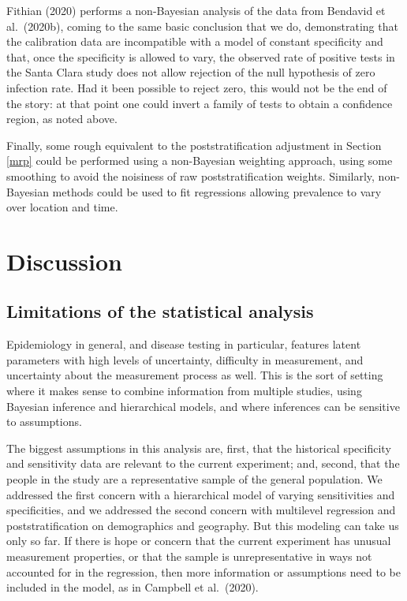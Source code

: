 \documentclass[11pt]{article}
\begin{document}
Fithian (2020) performs a non-Bayesian analysis of the data from Bendavid et al.\ (2020b), coming to the same basic conclusion that we do, demonstrating that the calibration data are incompatible with a model of constant specificity and that, once the specificity is allowed to vary, the observed rate of positive tests in the Santa Clara study does not allow rejection of the null hypothesis of zero infection rate.  Had it been possible to reject zero, this would not be the end of the story:  at that point one could invert a family of tests to obtain a confidence region, as noted above.

Finally, some rough equivalent to the poststratification adjustment in Section \ref{mrp} could be performed using a non-Bayesian weighting approach, using some smoothing to avoid the noisiness of raw poststratification weights.  Similarly, non-Bayesian methods could be used to fit regressions allowing prevalence to vary over location and time.

\section{Discussion}


\subsection{Limitations of the statistical analysis}


Epidemiology in general, and disease testing in particular, features latent parameters with high levels of uncertainty, difficulty in measurement, and uncertainty about the measurement process as well.  This is the sort of setting where it makes sense to combine information from multiple studies, using Bayesian inference and hierarchical models, and where inferences can be sensitive to assumptions.

The biggest assumptions in this analysis are, first, that the historical specificity and sensitivity data are relevant to the current experiment; and, second, that the people in the study are a representative sample of the general population.  We addressed the first concern with a hierarchical model of varying sensitivities and specificities, and we addressed the second concern with multilevel regression and poststratification on demographics and geography.  But this modeling can take us only so far.  If there is hope or concern that the current experiment has unusual measurement properties, or that the sample is unrepresentative in ways not accounted for in the regression, then more information or assumptions need to be included in the model, as in Campbell et al.\ (2020).
\end{document}
